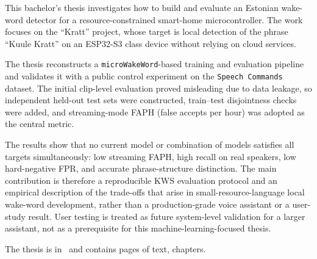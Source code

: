 This bachelor's thesis investigates how to build and evaluate an Estonian wake-word detector for a resource-constrained smart-home microcontroller. The work focuses on the \enquote{Kratt} project, whose target is local detection of the phrase \enquote{Kuule Kratt} on an ESP32-S3 class device without relying on cloud services.

The thesis reconstructs a \texttt{microWakeWord}-based training and evaluation pipeline and validates it with a public control experiment on the \texttt{Speech Commands} dataset. The initial clip-level evaluation proved misleading due to data leakage, so independent held-out test sets were constructed, train--test disjointness checks were added, and streaming-mode FAPH (false accepts per hour) was adopted as the central metric.

The results show that no current model or combination of models satisfies all targets simultaneously: low streaming FAPH, high recall on real speakers, low hard-negative FPR, and accurate phrase-structure distinction. The main contribution is therefore a reproducible KWS evaluation protocol and an empirical description of the trade-offs that arise in small-resource-language local wake-word development, rather than a production-grade voice assistant or a user-study result. User testing is treated as future system-level validation for a larger assistant, not as a prerequisite for this machine-learning-focused thesis.


The thesis is in \langEng~and contains \calculatepages pages of text, 
 chapters.
